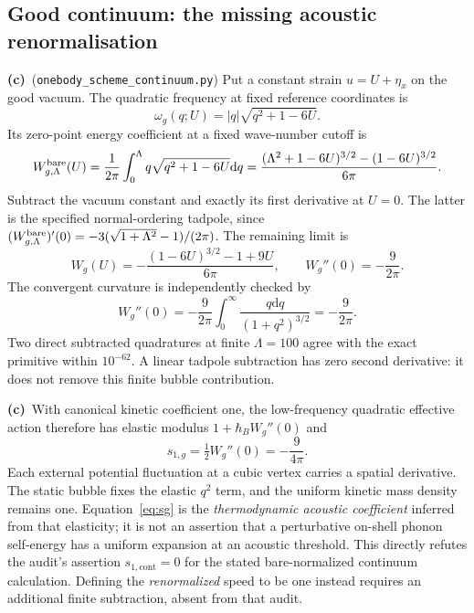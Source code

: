 \documentclass[11pt,a4paper]{article}
\newcommand{\Lc}{\textbf{(c)}\ }
\newcommand{\dd}{\mathrm d}
\newcommand{\ccheck}{\texttt{onebody\_\allowbreak scheme\_\allowbreak continuum.py}}
\begin{document}
\subsection{Good continuum: the missing acoustic renormalisation}
\Lc (\ccheck) Put a constant strain $u=U+\eta_x$ on the good vacuum.
The quadratic frequency at fixed reference coordinates is
\begin{equation}\label{eq:homogeneous}
 \omega_g(q;U)=|q|\sqrt{q^2+1-6U}.
\end{equation}
Its zero-point energy coefficient at a fixed wave-number cutoff is
\begin{equation}\label{eq:bareW}
 W_{g,\Lambda}^{\rm bare}(U)
 =\frac1{2\pi}\int_0^\Lambda q\sqrt{q^2+1-6U}\dd q
 =\frac{(\Lambda^2+1-6U)^{3/2}-(1-6U)^{3/2}}{6\pi}.
\end{equation}
Subtract the vacuum constant and exactly its first derivative at $U=0$.
The latter is the specified normal-ordering tadpole, since
$(W_{g,\Lambda}^{\rm bare})'(0)=-3(\sqrt{1+\Lambda^2}-1)/(2\pi)$.
The remaining limit is
\begin{equation}\label{eq:Wg}
 W_g(U)=-\frac{(1-6U)^{3/2}-1+9U}{6\pi},\qquad
 W_g''(0)=-\frac9{2\pi}.
\end{equation}
The convergent curvature is independently checked by
\begin{equation}
 W_g''(0)=-\frac9{2\pi}\int_0^\infty\frac{q\dd q}{(1+q^2)^{3/2}}
         =-\frac9{2\pi}.
\end{equation}
Two direct subtracted quadratures at finite $\Lambda=100$ agree with the
exact primitive within $10^{-62}$. A linear tadpole subtraction has zero
second derivative: it does not remove this finite bubble contribution.

\Lc With canonical kinetic coefficient one, the low-frequency quadratic
effective action therefore has elastic modulus $1+\hbar_BW_g''(0)$ and
\begin{equation}\label{eq:sg}
 s_{1,g}=\tfrac12W_g''(0)=-\frac9{4\pi}.
\end{equation}
Each external potential fluctuation at a cubic vertex carries a spatial
derivative. The static bubble fixes the elastic $q^2$ term, and the uniform
kinetic mass density remains one. Equation~\eqref{eq:sg} is the
\emph{thermodynamic acoustic coefficient} inferred from that elasticity;
it is not an assertion that a perturbative on-shell phonon self-energy
has a uniform expansion at an acoustic threshold. This directly refutes
the audit's assertion $s_{1,\mathrm{cont}}=0$ for the stated bare-normalized
continuum calculation. Defining the \emph{renormalized} speed to be one
instead requires an additional finite subtraction, absent from that audit.
\end{document}
